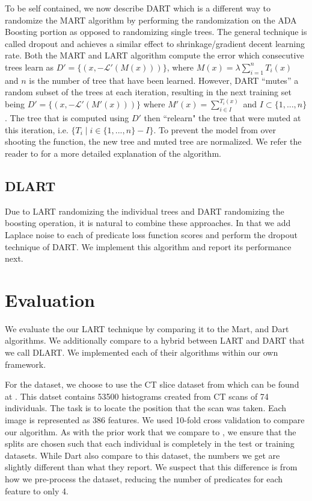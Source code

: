 \documentclass{article} %
\begin{document}
To be self contained, we now describe DART\cite{dart} which is a different way to randomize the MART algorithm by performing the randomization on the ADA Boosting portion as opposed to randomizing single trees. The general technique is called dropout and achieves a similar effect to shrinkage/gradient decent learning rate. Both the MART and LART algorithm compute the error which consecutive trees learn as $D'=\{(x,-\mathcal{L}'(M(x)))\}$, where $M(x) =\lambda \sum_{i=1}^n T_i(x)$ and $n$ is the number of tree that have been learned. However, DART ``mutes'' a random subset of the trees at each iteration, resulting in the next training set being $D'=\{(x,-\mathcal{L}'(M'(x)))\}$ where $M'(x) = \sum_{i\in I}^{T_i(x)}$ and $I\subset \{1,...,n\}$. The tree that is computed using $D'$ then ``relearn" the tree that were muted at this iteration, i.e. $\{T_i \mid i\in \{1,...,n\}-I\}$. To prevent the model from over shooting the function, the new tree and muted tree are normalized. We refer the reader to \cite{dart} for a more detailed explanation of the algorithm.

\subsection{DLART}

Due to LART randomizing the individual trees and DART randomizing the boosting operation, it is natural to combine these approaches. In that we add Laplace noise to each of predicate loss function scores and perform the dropout technique of DART. We implement this algorithm and report its performance next.

\section{Evaluation}

We evaluate the our LART technique by comparing it to the Mart, and Dart\cite{dart} algorithms. We additionally compare to a hybrid between LART and DART that we call DLART. We implemented each of their algorithms within our own framework. 

For the dataset, we choose to use the CT slice dataset from \cite{graf20112d} which can be found at \cite{uci_ctSlice}. This datset contains 53500 histograms created from CT scans of 74 individuals. The task is to locate the position that the scan was taken. Each image is represented as 386 features. We used 10-fold cross validation to compare our algorithm. As with the prior work that we compare to \cite{dart}, we ensure that the splits are chosen such that each individual is completely in the test or training datasets. While Dart\cite{dart} also compare to this dataset, the numbers we get are slightly different than what they report. We suspect that this difference is from how we pre-process the dataset, reducing the number of predicates for each feature to only 4.
\end{document}
